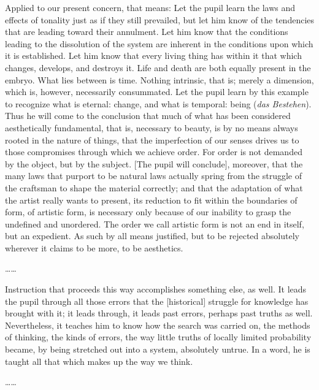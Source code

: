 \documentclass[12pt]{article}
\begin{document}
\begin{mdframed}
Applied to our present concern, that means: Let the pupil learn the laws and effects of tonality just as if they still prevailed, but let him know of the tendencies that are leading toward their annulment. Let him know that the conditions leading to the dissolution of the system are inherent in the conditions upon which it is established. Let him know that every living thing has within it that which changes, develops, and destroys it. Life and death are both equally present in the embryo. What lies between is time. Nothing intrinsic, that is; merely a dimension, which is, however, necessarily consummated. Let the pupil learn by this example to recognize what is eternal: change, and what is temporal: being (\emph{das Bestehen}). Thus he will come to the conclusion that much of what has been considered aesthetically fundamental, that is, necessary to beauty, is by no means always rooted in the nature of things, that the imperfection of our senses drives us to those compromises through which we achieve order. For order is not demanded by the object, but by the subject. [The pupil will conclude], moreover, that the many laws that purport to be natural laws actually spring from the struggle of the craftsman to shape the material correctly; and that the adaptation of what the artist really wants to present, its reduction to fit within the boundaries of form, of artistic form, is necessary only because of our inability to grasp the undefined and unordered. The order we call artistic form is not an end in itself, but an expedient. As such by all means justified, but to be rejected absolutely wherever it claims to be more, to be aesthetics.

\ldots\ldots{}

Instruction that proceeds this way accomplishes something else, as well. It leads the pupil through all those errors that the [historical] struggle for knowledge has brought with it; it leads through, it leads past errors, perhaps past truths as well. Nevertheless, it teaches him to know how the search was carried on, the methods of thinking, the kinds of errors, the way little truths of locally limited probability became, by being stretched out into a system, absolutely untrue. In a word, he is taught all that which makes up the way we think.

\ldots\ldots{}


\end{mdframed}
\end{document}
